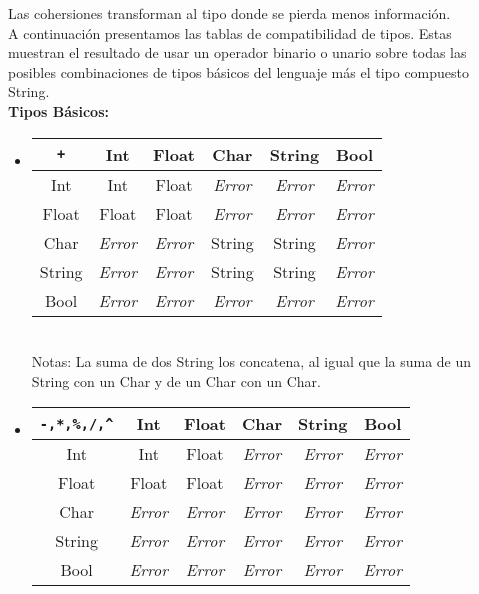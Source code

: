 \documentclass[12pt, spanish]{report}
\begin{document}
\indent Las cohersiones transforman al tipo donde se pierda menos informaci\'on.\\

\indent A continuaci\'on presentamos las tablas de compatibilidad de
tipos. Estas muestran el resultado de usar un operador binario o unario sobre
todas las posibles combinaciones de tipos b\'asicos del lenguaje m\'as
el tipo compuesto String.\\

\textbf{Tipos B\'asicos:}
\begin{itemize}
\item
\begin{tabular}{|c||ccccc|}
	\hline
\texttt{+}  &  Int    &        Float & Char         &      String  & Bool  \\
	\hline \hline
Int    & Int          & Float        & \emph{Error} & \emph{Error} & \emph{Error} \\
Float  & Float        & Float        & \emph{Error} & \emph{Error} & \emph{Error}\\
Char   & \emph{Error} & \emph{Error} & String       & String       & \emph{Error}\\
String & \emph{Error} & \emph{Error} & String       & String       & \emph{Error}\\
Bool   & \emph{Error} & \emph{Error} & \emph{Error} & \emph{Error} & \emph{Error}\\
	\hline
\end{tabular}\\
Notas: La suma de dos String los concatena, al igual que la suma de un String
con un Char y de un Char con un Char.

\item
\begin{tabular}{|c||ccccc|}
	\hline
\texttt{-,*,\%,/,\^}  &  Int  & Float & Char  & String & Bool  \\
	\hline \hline
Int    & Int   & Float & \emph{Error} & \emph{Error} & \emph{Error}\\
Float  & Float & Float & \emph{Error} & \emph{Error} & \emph{Error}\\
Char   & \emph{Error} & \emph{Error} & \emph{Error} & \emph{Error} & \emph{Error} \\
String & \emph{Error} & \emph{Error} & \emph{Error} & \emph{Error} & \emph{Error} \\
Bool   & \emph{Error} & \emph{Error} & \emph{Error} & \emph{Error} & \emph{Error} \\
	\hline
\end{tabular}\\


\end{itemize}
\end{document}
